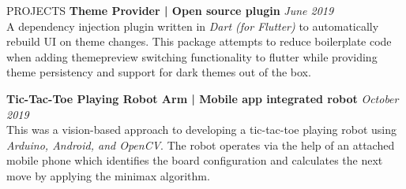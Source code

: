 \documentclass{cv}
\begin{document}
\begin{rSection}{PROJECTS}
    {\bf Theme Provider | Open source plugin}                       \hfill {\em June 2019}
    \\
    A dependency injection plugin written in \textit{Dart (for Flutter)} to automatically rebuild
    UI on theme changes.
    This package attempts to reduce boilerplate code when adding themepreview switching functionality to flutter
    while providing theme persistency and support for dark themes out of the box.
    \\ 
    \par\vspace{7pt}

    {\bf Tic-Tac-Toe Playing Robot Arm | Mobile app integrated robot}     \hfill {\em October 2019}
    \\
    This was a vision-based approach to developing a tic-tac-toe playing robot using \textit{Arduino, Android, and OpenCV}.
    The robot operates via the help of an attached mobile phone which identifies the board configuration
    and calculates the next move by applying the minimax algorithm.
    \\ 
    \par\vspace{7pt}





\end{rSection}
\end{document}
